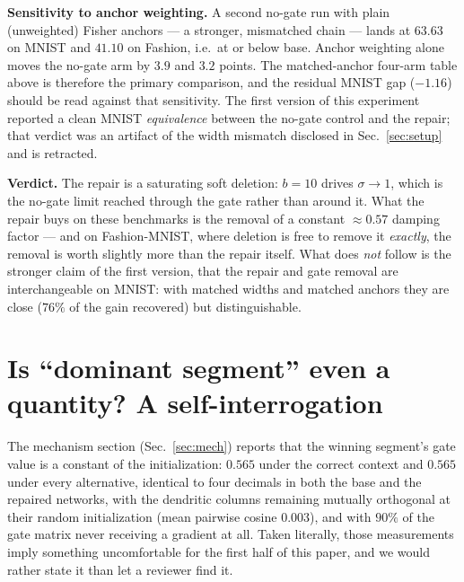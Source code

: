 \documentclass[10pt]{article}
\begin{document}
\textbf{Sensitivity to anchor weighting.} A second no-gate run with
plain (unweighted) Fisher anchors --- a stronger, mismatched chain ---
lands at $63.63$ on MNIST and $41.10$ on Fashion, i.e.\ at or below
base. Anchor weighting alone moves the no-gate arm by $3.9$ and $3.2$
points. The matched-anchor four-arm table above is therefore the
primary comparison, and the residual MNIST gap ($-1.16$) should be read
against that sensitivity. The first version of this experiment reported
a clean MNIST \emph{equivalence} between the no-gate control and the
repair; that verdict was an artifact of the width mismatch disclosed in
Sec.~\ref{sec:setup} and is retracted.

\textbf{Verdict.} The repair is a saturating soft deletion: $b{=}10$
drives $\sigma \to 1$, which is the no-gate limit reached through the
gate rather than around it. What the repair buys on these benchmarks is
the removal of a constant ${\approx}0.57$ damping factor --- and on
Fashion-MNIST, where deletion is free to remove it \emph{exactly}, the
removal is worth slightly more than the repair itself. What does
\emph{not} follow is the stronger claim of the first version, that the
repair and gate removal are interchangeable on MNIST: with matched
widths and matched anchors they are close ($76\%$ of the gain
recovered) but distinguishable.






\section{Is ``dominant segment'' even a quantity? A self-interrogation}
\label{sec:pseudo}

The mechanism section (Sec.~\ref{sec:mech}) reports that the winning
segment's gate value is a constant of the initialization: $0.565$ under the
correct context and $0.565$ under every alternative, identical to four
decimals in both the base and the repaired networks, with the dendritic
columns remaining mutually orthogonal at their random initialization
(mean pairwise cosine $0.003$), and with $90\%$ of the gate matrix never
receiving a gradient at all. Taken literally, those measurements imply
something uncomfortable for the first half of this paper, and we would
rather state it than let a reviewer find it.
\end{document}
